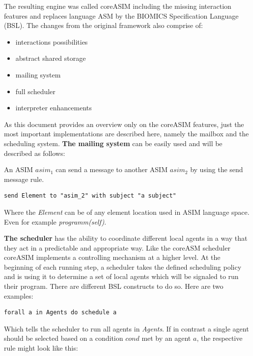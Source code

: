 The resulting engine was called coreASIM including the missing interaction features \cite{BIOMICSD42}\cite{BIOMICSD52} and replaces language ASM by the BIOMICS Specification Language (BSL). The changes from the original framework also comprise of:

\begin{itemize}
	\item interactions possibilities
	\item abstract shared storage
	\item mailing system
	\item full scheduler
	\item interpreter enhancements
\end{itemize}

As this document provides an overview only on the coreASIM features, just the most important implementations are described here, namely the mailbox and the scheduling system. \textbf{The mailing system} can be easily used and will be described as follows:

\begin{minipage}{1.0\textwidth}
An ASIM $asim_1$ can send a message to another ASIM $asim_2$ by using the send message rule.\nopagebreak
\begin{lstlisting}[language=bsl]
	send Element to "asim_2" with subject "a subject"
\end{lstlisting}

Where the \textit{Element} can be of any element location used in ASIM language space. Even for example \textit{programm(self)}.
\end{minipage}

\textbf{The scheduler} has the ability to coordinate different local agents in a way that they act in a predictable and appropriate way. Like the coreASM scheduler coreASIM implements a controlling mechanism at a higher level. At the beginning of each running step, a scheduler takes the defined scheduling policy and is using it to determine a set of local agents which will be signaled to run their program. There are different BSL constructs to do so. Here are two examples:

\begin{lstlisting}[language=bsl]
	forall a in Agents do schedule a
\end{lstlisting}

Which tells the scheduler to run all agents in \textit{Agents}. If  in contrast a single agent should be selected based on a condition $cond$ met by an agent $a$, the respective rule might look like this:

